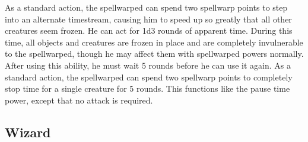  As a standard action, the spellwarped can spend two spellwarp points to step into an alternate timestream, causing him to speed up so greatly that all other creatures seem frozen. He can act for 1d3 rounds of apparent time. During this time, all objects and creatures are frozen in place and are completely invulnerable to the spellwarped, though he may affect them with spellwarped powers normally. After using this ability, he must wait 5 rounds before he can use it again.
 As a standard action, the spellwarped can spend two spellwarp points to completely stop time for a single creature for 5 rounds. This functions like the pause time power, except that no attack is required.

\subsection{Wizard}
